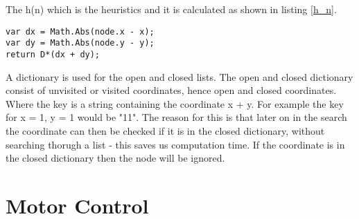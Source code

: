 The h(n) which is the heuristics and it is calculated as shown in listing \ref{h_n}. 

\begin{lstlisting}[caption={Calculation of h(n).}, label=h_n]
var dx = Math.Abs(node.x - x);
var dy = Math.Abs(node.y - y);
return D*(dx + dy);
\end{lstlisting}

A dictionary is used for the open and closed lists. The open and closed dictionary consist of unvisited or visited coordinates, hence open and closed coordinates. Where the key is a string containing the coordinate x + y. For example the key for x = 1, y = 1 would be "11". The reason for this is that later on in the search the coordinate can then be checked if it is in the closed dictionary, without searching thorugh a list - this saves us computation time. If the coordinate is in the closed dictionary then the node will be ignored.



\section{Motor Control}

